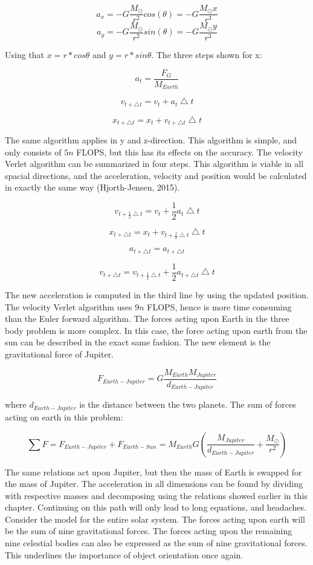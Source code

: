 \documentclass[10pt,a4paper]{article}
\begin{document}
$$a_x=-G\frac{M_{\odot}}{r^2}cos(\theta)=-G\frac{M_{\odot}x}{r^3}$$
$$a_y=-G\frac{M_{\odot}}{r^2}sin(\theta)=-G\frac{M_{\odot}y}{r^3}$$

\noindent Using that $x=r*cos\theta$ and $y=r*sin\theta$.  The three steps shown for x:

$$a_t=\frac{F_G}{M_{Earth}}$$

$$v_{t+\bigtriangleup t}=v_t + a_t\bigtriangleup t $$

$$x_{t+\bigtriangleup t}=x_t + v_{t+\bigtriangleup t}\bigtriangleup t$$

\noindent The same algorithm applies in y and z-direction. This algorithm is simple, and only consists of $5n$ FLOPS, but this has its effects on the accuracy. The velocity Verlet algorithm can be summarized in four steps. This algorithm is viable in all spacial directions, and the acceleration, velocity and position would be calculated in exactly the same way (Hjorth-Jensen, 2015).  



$$v_{t+\frac{1}{2}\bigtriangleup t}=v_t + \frac{1}{2}a_t\bigtriangleup t$$

$$x_{t+\bigtriangleup t}=x_t + v_{t+\frac{1}{2}\bigtriangleup t}\bigtriangleup t $$




$$a_{t+\bigtriangleup t}=a_{t+\bigtriangleup t}$$

$$v_{t+\bigtriangleup t}=v_{t+\frac{1}{2}\bigtriangleup t} + \frac{1}{2}a_{t+\bigtriangleup t}\bigtriangleup t$$


\noindent The new acceleration is computed in the third line by using the updated position. The velocity Verlet algorithm uses $9n$ FLOPS, hence is more time consuming than the Euler forward algorithm. The forces acting upon Earth in the three body problem is more complex. In this case, the force acting upon earth from the sun can be described in the exact same fashion. The new element is the gravitational force of Jupiter. 

$$F_{Earth-Jupiter}=G\frac{M_{Earth}M_{Jupiter}}{d_{Earth-Jupiter}}$$

\noindent where $d_{Earth-Jupiter}$ is the distance between the two planets. The sum of forces acting on earth in this problem: 

$$\sum F = F_{Earth-Jupiter}+ F_{Earth-Sun}= M_{Earth}G(\frac{M_{Jupiter}}{d_{Earth-Jupiter}} + \frac{M_{\odot}}{r^2}) $$

\noindent The same relations act upon Jupiter, but then the mass of Earth is swapped for the mass of Jupiter. The acceleration in all dimensions can be found by dividing with respective masses and decomposing using the relations showed earlier in this chapter. Continuing on this path will only lead to long equations, and headaches. Consider the model for the entire solar system. The forces acting upon earth will be the sum of nine gravitational forces. The forces acting upon the remaining nine celestial bodies can also be expressed as the sum of nine gravitational forces. This underlines the importance of object orientation once again.\\
\end{document}
